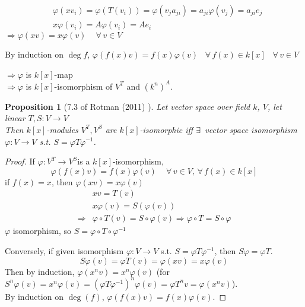 \documentclass[10pt]{amsart}
\newtheorem{proposition}{Proposition}
\begin{document}
\begin{multicols*}{2}
\begin{enumerate}
	\[
	\begin{aligned}
	& \varphi(xv_i) = \varphi(T(v_i)) = \varphi(v_j a_{ji} ) = a_{ji} \varphi(v_j) = a_{ji}e_j \\
	& x\varphi(v_i) = A\varphi(v_i) = Ae_i
	\end{aligned}
	\]
	$\Longrightarrow \varphi(xv) = x\varphi(v) \quad \, \forall \, v \in V$
	
	By induction on $\deg{f}$, $\varphi(f(x)v) = f(x) \varphi(v)$ \quad \, $\forall \, f(x) \in k[x]$ \quad \, $\forall \, v \in V$ 
	
	$\Longrightarrow \varphi$ is $k[x]$-map \\
	$\Longrightarrow \varphi$ is $k[x]$-isomorphism of $V^T$ and $(k^n)^A$.  
	
\end{enumerate}


\begin{proposition}[7.3 of Rotman (2011) \cite{JRotman2010}]\label{Prop:kxmoduleisomorphism}
	Let vector space over field $k$, $V$, let linear $T,S : V \to V$ \\
	Then $k[x]$-modules $V^T, V^S$ are $k[x]$-isomorphic iff $\exists \, $ vector space isomorphism $\varphi : V \to V$ s.t. $S = \varphi T \varphi^{-1}$.  
\end{proposition}

\begin{proof}
	If $\varphi:V^T \to V^S$is a $k[x]$-isomorphism, 
	\[
	\varphi(f(x)v) = f(x)\varphi(v) \quad \, \forall \, v \in V , \, \forall \, f(x) \in k[x]
	\]
	if $f(x)=x$, then $\varphi(xv) = x\varphi(v)$
	\[
	\begin{aligned}
	& xv = T(v) \\ 
	& x\varphi(v) = S(\varphi(v)) \\ 
	\Longrightarrow & \varphi \circ T(v) = S \circ \varphi(v) \Longrightarrow \varphi \circ T = S \circ \varphi 
	\end{aligned}
	\]
	$\varphi$ isomorphism, so $S = \varphi \circ T \circ \varphi^{-1}$
	
	Conversely, if given isomorphism $\varphi: V \to V$ s.t. $S = \varphi T \varphi^{-1}$, then $S\varphi = \varphi T$.  
	\[
	S\varphi(v) = \varphi T(v) = \varphi(xv) = x\varphi(v)
	\]
	Then by induction, $\varphi(x^nv) = x^n\varphi(v)$ (for $S^n\varphi(v) = x^n\varphi(v) = (\varphi T \varphi^{-1})^n \varphi(v) = \varphi T^n v = \varphi(x^nv)$).  \\
	By induction on $\deg{(f)}$, $\varphi(f(x)v) = f(x)\varphi(v)$.  
	
	
\end{proof}




\end{multicols*}
\end{document}
